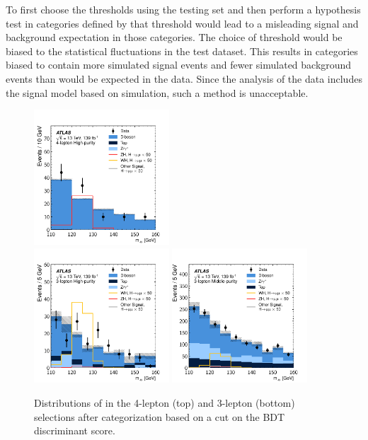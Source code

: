 To first choose the thresholds using the testing set and then perform a hypothesis test in categories defined by that threshold would lead to a misleading signal and background expectation in those categories.
The choice of threshold would be biased to the statistical fluctuations in the test dataset.
This results in categories biased to contain more simulated signal events and fewer simulated background events than would be expected in the data.
Since the analysis of the data includes the signal model based on simulation, such a method is unacceptable.

\begin{figure}[htpb]
  \centering
  \includegraphics[width=0.45\textwidth]{figures/hmm/public/postCut/histo-4lep0-muu.pdf} \\
  \includegraphics[width=0.45\textwidth]{figures/hmm/public/postCut/histo-3lep0-muu.pdf} 
  \includegraphics[width=0.45\textwidth]{figures/hmm/public/postCut/histo-3lep1-muu.pdf} 
\caption{Distributions of \muu in the 4-lepton (top) and 3-lepton (bottom) selections after categorization based on a cut on the BDT discriminant score.}
    \label{fig:hmmPostcutMassHists}
\end{figure}
\clearpage

